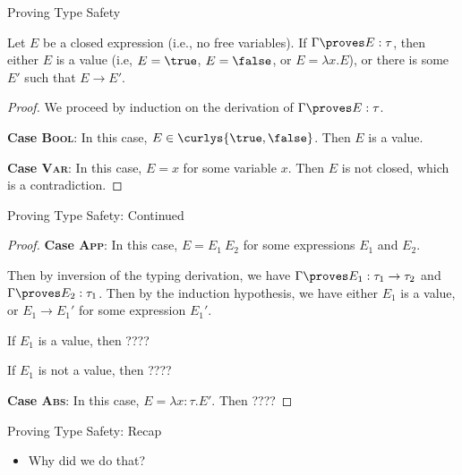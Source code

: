 \documentclass[leqno,presentation,usenames,dvipsnames]{beamer}
\begin{document}
\begin{frame}{Proving Type Safety}
\begin{theorem}[Progress]
    Let $E$ be a closed expression (i.e., no free variables).
    If $\Gamma \proves E : \tau$, then either $E$ is a value (i.e, $E = \true$, $E = \false$, or $E = \lambda x. E$), or there is some $E'$ such that $E \to E'$.
\end{theorem}
\begin{proof}
    We proceed by induction on the derivation of $\Gamma \proves E : \tau$.

    \textbf{Case \textsc{Bool}}: In this case, $E \in \curlys{\true, \false}$.
    Then $E$ is a value.

    \textbf{Case \textsc{Var}}: In this case, $E = x$ for some variable $x$.
    Then $E$ is not closed, which is a contradiction.
\end{proof}
\end{frame}

\begin{frame}{Proving Type Safety: Continued}
\begin{proof}
    \textbf{Case \textsc{App}}: In this case, $E = E_1~E_2$ for some expressions $E_1$ and $E_2$.

    Then by inversion of the typing derivation, we have $\Gamma \proves E_1 : \tau_1 \to \tau_2$ and $\Gamma \proves E_2 : \tau_1$.
    Then by the induction hypothesis, we have either $E_1$ is a value, or $E_1 \to E_1'$ for some expression $E_1'$.

    If $E_1$ is a value, then ???? %

    If $E_1$ is not a value, then ???? %

    \textbf{Case \textsc{Abs}}: In this case, $E = \lambda x : \tau. E'$.
    Then ???? %

\end{proof}
\end{frame}

\begin{frame}{Proving Type Safety: Recap}
    \begin{itemize}
        \item Why did we do that?
    \end{itemize}
\end{frame}
\end{document}
